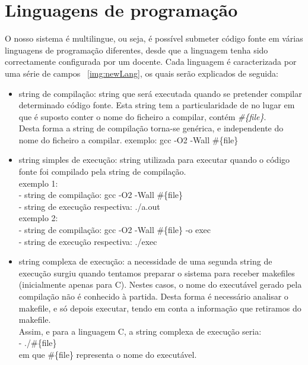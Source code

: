 \section{Linguagens de programação}\label{sec lps}
O nosso sistema é multilingue, ou seja, é possível submeter código fonte em várias linguagens de programação diferentes, desde que 
a linguagem tenha sido correctamente configurada por um docente.
Cada linguagem é caracterizada por uma série de campos ~\ref{img:newLang}, os quais serão explicados de seguida:
\begin{itemize}
\item string de compilação: string que será executada quando se pretender compilar determinado código fonte. Esta string tem a
particularidade de no lugar em que é suposto conter o nome do ficheiro a compilar, contém \textit{\#\{file\}}.\\
Desta forma a string de compilação torna-se genérica, e independente do nome do ficheiro a compilar.
exemplo: gcc -O2 -Wall \#\{file\}

\item string simples de execução: string utilizada para executar quando o código fonte foi compilado pela string de compilação.\\
exemplo 1:\\ 
- string de compilação: gcc -O2 -Wall \#\{file\}\\
- string de execução respectiva: ./a.out\\
exemplo 2:\\
- string de compilação: gcc -O2 -Wall \#\{file\} -o exec\\
- string de execução respectiva: ./exec\\

\item string complexa de execução: a necessidade de uma segunda string de execução surgiu quando tentamos preparar o sistema para receber makefiles (inicialmente apenas para C). Nestes casos, o nome do executável gerado pela compilação não é conhecido à partida.
Desta forma é necessário analisar o makefile, e só depois executar, tendo em conta a informação que retiramos do makefile.\\
Assim, e para a linguagem C, a string complexa de execução seria:\\
- ./\#\{file\}\\
em que \#\{file\} representa o nome do executável.


\end{itemize}
